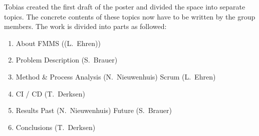 \documentclass[11pt]{meetingmins}
\begin{document}
Tobias created the first draft of the poster and divided the space into separate topics.
The concrete contents of these topics now have to be written by the group members. The work is divided into parts as followed:

\begin{enumerate}
	\item About FMMS ({\rm (L.~Ehren)})
	
	\item Problem Description {\rm (S.~Brauer)}
	
	\item Method \& Process
	\subitem Analysis {\rm (N.~Nieuwenhuis)}
	\subitem Scrum {\rm (L.~Ehren)}
	
	\item CI / CD {\rm (T.~Derksen)}
	
	\item Results
	\subitem Past {\rm (N.~Nieuwenhuis)}
	\subitem Future {\rm (S.~Brauer)}
	
	\item Conclusions {\rm (T.~Derksen)}
\end{enumerate}
\end{document}
